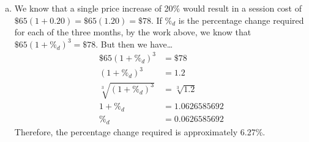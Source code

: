 \documentclass[11pt,letterpaper]{article}
\begin{document}
\begin{enumerate}[(a)]
\item We know that a single price increase of 20\% would result in a session cost of $\$65(1 + 0.20)= \$65(1.20)= \$78$. If $\%_d$ is the percentage change required for each of the three months, by the work above, we know that $\$65(1 + \%_d)^3= \$78$. But then we have\dots
	\[
	\begin{aligned}
	\$65(1 + \%_d)^3&= \$78 \\
	(1 + \%_d)^3&= 1.2 \\
	\sqrt[3]{(1 + \%_d)^3}&= \sqrt[3]{1.2} \\
	1 + \%_d&= 1.0626585692 \\
	\%_d&= 0.0626585692
	\end{aligned}
	\]
Therefore, the percentage change required is approximately 6.27\%. 
\end{enumerate}
\end{document}
